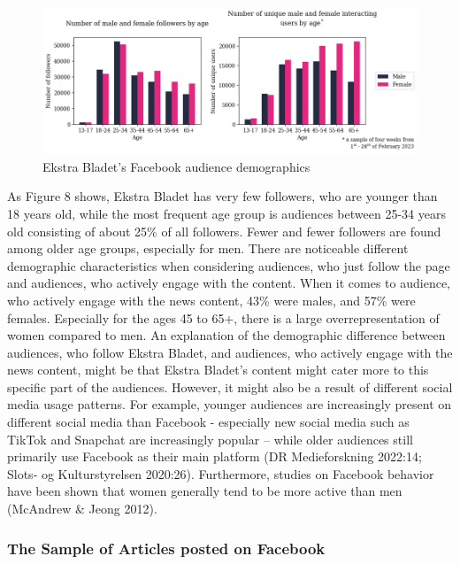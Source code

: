 \documentclass[
]{article}
\begin{document}
\begin{figure}[H]

{\centering \includegraphics[width=0.8\linewidth]{images/fb_audience} 

}

\caption{Ekstra Bladet's Facebook audience demographics}\label{fig:fb_audience}
\end{figure}

\noindent As Figure 8 shows, Ekstra Bladet has very few followers, who
are younger than 18 years old, while the most frequent age group is
audiences between 25-34 years old consisting of about 25\% of all
followers. Fewer and fewer followers are found among older age groups,
especially for men. There are noticeable different demographic
characteristics when considering audiences, who just follow the page and
audiences, who actively engage with the content. When it comes to
audience, who actively engage with the news content, 43\% were males,
and 57\% were females. Especially for the ages 45 to 65+, there is a
large overrepresentation of women compared to men. An explanation of the
demographic difference between audiences, who follow Ekstra Bladet, and
audiences, who actively engage with the news content, might be that
Ekstra Bladet's content might cater more to this specific part of the
audiences. However, it might also be a result of different social media
usage patterns. For example, younger audiences are increasingly present
on different social media than Facebook - especially new social media
such as TikTok and Snapchat are increasingly popular -- while older
audiences still primarily use Facebook as their main platform (DR
Medieforskning 2022:14; Slots- og Kulturstyrelsen 2020:26). Furthermore,
studies on Facebook behavior have been shown that women generally tend
to be more active than men (McAndrew \& Jeong 2012).

\hypertarget{the-sample-of-articles-posted-on-facebook}{%
\subsubsection{The Sample of Articles posted on
Facebook}\label{the-sample-of-articles-posted-on-facebook}}
\end{document}
